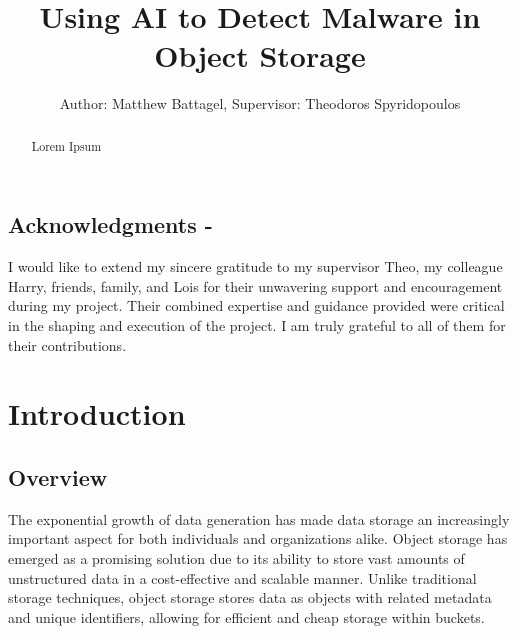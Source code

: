 \documentclass[12pt, conference, final, a4paper, onecolumn, compsoc]{IEEEtran}
\begin{document}
\title{Using AI to Detect Malware in Object Storage} \author{Author: Matthew
  Battagel, Supervisor: Theodoros Spyridopoulos} 
\maketitle{}

\subsection*{Acknowledgments - }

I would like to extend my sincere gratitude to my supervisor Theo, my colleague
Harry, friends, family, and Lois for their unwavering support and encouragement
during my project. Their combined expertise and guidance provided were critical
in the shaping and execution of the project. I am truly grateful to all of them
for their contributions.

\bigskip

\begin{abstract}
    Lorem Ipsum
\end{abstract}

\pagebreak






    \tableofcontents{}


    \section{Introduction}
    \subsection*{Overview}
    The exponential growth of data generation has made data storage an
    increasingly important aspect for both individuals and organizations alike.
    Object storage has emerged as a promising solution due to its ability to
    store vast amounts of unstructured data in a cost-effective and scalable
    manner. Unlike traditional storage techniques, object storage stores data as
    objects with related metadata and unique identifiers, allowing for efficient
    and cheap storage within buckets.
\end{document}
